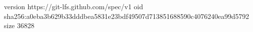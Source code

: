 version https://git-lfs.github.com/spec/v1
oid sha256:a0eba3b629b33dddbea5831e23bdf49507d713851688590c4076240ea99d5792
size 36828
